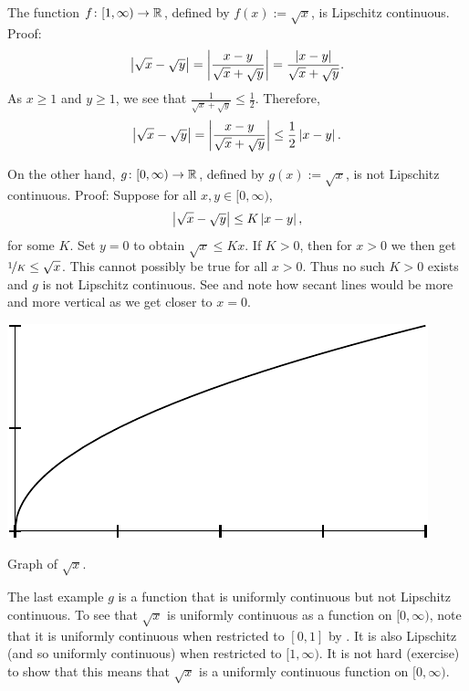 \begin{example}
The function $f \colon [1,\infty) \to {\mathbb{R}}$, defined by $f(x) := \sqrt{x}$,
is Lipschitz continuous. Proof:
\begin{equation*}
\left\lvert {\sqrt{x}-\sqrt{y}} \right\rvert = 
\left\lvert {\frac{x-y}{\sqrt{x}+\sqrt{y}}} \right\rvert
=
\frac{\left\lvert {x-y} \right\rvert}{\sqrt{x}+\sqrt{y}} .
\end{equation*}
As $x \geq 1$ and $y \geq 1$, we see that $\frac{1}{\sqrt{x}+\sqrt{y}}
\leq \frac{1}{2}$.  Therefore,
\begin{equation*}
\left\lvert {\sqrt{x}-\sqrt{y}} \right\rvert = 
\left\lvert {\frac{x-y}{\sqrt{x}+\sqrt{y}}} \right\rvert
\leq
\frac{1}{2}
\left\lvert {x-y} \right\rvert.
\end{equation*}

On the other hand, $g \colon [0,\infty) \to {\mathbb{R}}$, defined by
$g(x) := \sqrt{x}$, is not Lipschitz continuous.  Proof:
Suppose for all $x,y \in [0,\infty)$,
\begin{equation*}
\left\lvert {\sqrt{x}-\sqrt{y}} \right\rvert 
\leq
K \left\lvert {x-y} \right\rvert ,
\end{equation*}
for some $K$.  Set $y=0$ to obtain
$\sqrt{x} \leq K x$.   If $K > 0$, then for $x > 0$ we then get
$\nicefrac{1}{K} \leq \sqrt{x}$.  This cannot possibly be true for all
$x > 0$.  Thus no such $K > 0$ exists and $g$ is not
Lipschitz continuous.  See  and note how secant
lines would be more and more vertical as we get closer to $x=0$.
\begin{myfigureht}
\includegraphics{figures/sqrtgraph}
\caption{Graph of $\sqrt{x}$.\label{fig:sqrtgraph}}
\end{myfigureht}

The last example $g$ is a function that is uniformly
continuous but not Lipschitz continuous.
To see that $\sqrt{x}$ is
uniformly continuous as a function on $[0,\infty)$,
note that it is uniformly continuous when restricted to $[0,1]$ by .
It is also Lipschitz (and so uniformly continuous) when restricted to $[1,\infty)$.
It is not hard (exercise) to show that this means that $\sqrt{x}$ is a
uniformly continuous function on $[0,\infty)$.
\end{example}

